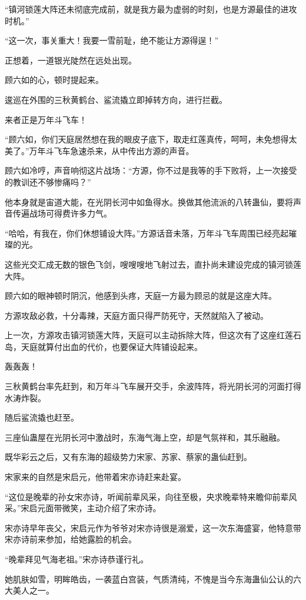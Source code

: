\begin{this_body}
“镇河锁莲大阵还未彻底完成前，就是我方最为虚弱的时刻，也是方源最佳的进攻时机。”

“这一次，事关重大！我要一雪前耻，绝不能让方源得逞！”

正想着，一道银光陡然在远处出现。

顾六如的心，顿时提起来。

逡巡在外围的三秋黄鹤台、鲨流撬立即掉转方向，进行拦截。

来者正是万年斗飞车！

“顾六如，你们天庭居然想在我的眼皮子底下，取走红莲真传，呵呵，未免想得太美了。”万年斗飞车急速杀来，从中传出方源的声音。

顾六如冷哼，声音响彻这片战场：“方源，你不过是我等的手下败将，上一次接受的教训还不够惨痛吗？”

他本身就是宙道大能，在光阴长河中如鱼得水。换做其他流派的八转蛊仙，要将声音传遍战场可得费许多力气。

“哈哈，有我在，你们休想铺设大阵。”方源话音未落，万年斗飞车周围已经亮起璀璨的光。

这些光交汇成无数的银色飞剑，嗖嗖嗖地飞射过去，直扑尚未建设完成的镇河锁莲大阵。

顾六如的眼神顿时阴沉，他感到头疼，天庭一方最为顾忌的就是这座大阵。

方源攻敌必救，十分毒辣，天庭方面只得严防死守，天然就陷入了被动。

上一次，方源攻击镇河锁莲大阵，天庭可以主动拆除大阵，但这次有了这座红莲石岛，天庭就算付出血的代价，也要保证大阵铺设起来。

轰轰轰！

三秋黄鹤台率先赶到，和万年斗飞车展开交手，余波阵阵，将光阴长河的河面打得水涛炸裂。

随后鲨流撬也赶至。

三座仙蛊屋在光阴长河中激战时，东海气海上空，却是气氛祥和，其乐融融。

既华彩云之后，又有东海的超级势力宋家、苏家、蔡家的蛊仙赶到。

宋家来的自然是宋启元，他带着宋亦诗赶来赴宴。

“这位是晚辈的孙女宋亦诗，听闻前辈风采，向往至极，央求晚辈特来瞻仰前辈风采。”宋启元面带微笑，主动介绍了宋亦诗。

宋亦诗早年丧父，宋启元作为爷爷对宋亦诗很是溺爱，这一次东海盛宴，他特意带宋亦诗前来参加，给她露脸的机会。

“晚辈拜见气海老祖。”宋亦诗恭谨行礼。

她肌肤如雪，明眸皓齿，一袭蓝白宫装，气质清纯，不愧是当今东海蛊仙公认的六大美人之一。


\end{this_body}
